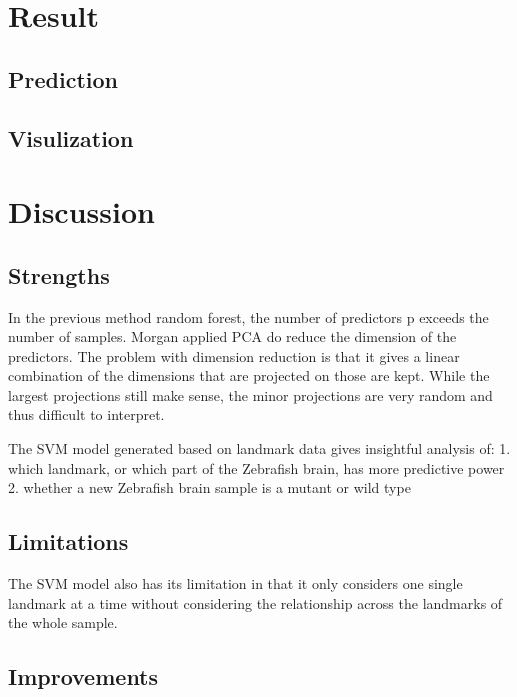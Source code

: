\documentclass[10pt,letterpaper]{article}
\begin{document}
\section{Result}\label{result}

\subsection{Prediction}\label{prediction}

\subsection{Visulization}\label{visulization}

\section{Discussion}\label{discussion}

\subsection{Strengths}\label{strengths}

In the previous method random forest, the number of predictors p exceeds
the number of samples. Morgan applied PCA do reduce the dimension of the
predictors. The problem with dimension reduction is that it gives a
linear combination of the dimensions that are projected on those are
kept. While the largest projections still make sense, the minor
projections are very random and thus difficult to interpret.

The SVM model generated based on landmark data gives insightful analysis
of: 1. which landmark, or which part of the Zebrafish brain, has more
predictive power 2. whether a new Zebrafish brain sample is a mutant or
wild type

\subsection{Limitations}\label{limitations}

The SVM model also has its limitation in that it only considers one
single landmark at a time without considering the relationship across
the landmarks of the whole sample.

\subsection{Improvements}\label{improvements}
\end{document}
